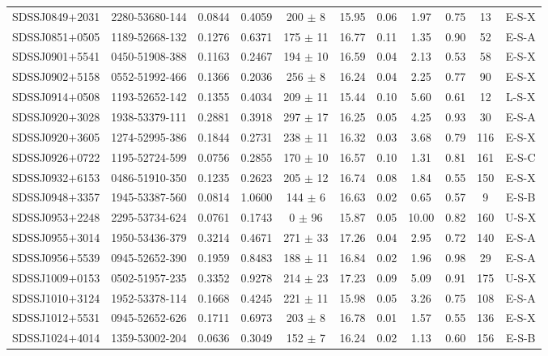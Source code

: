 \documentclass{emulateapj}
\begin{document}
\begin{table*}[htbp]
\begin{center}
\begin{tabular}{c c c c c c c c c c c}
SDSSJ0849$+$2031 & 2280-53680-144 & 0.0844 & 0.4059 & 200 $\pm$    8 & 15.95 & 0.06 & 1.97 & 0.75 & 13 & E-S-X \\ 
SDSSJ0851$+$0505 & 1189-52668-132 & 0.1276 & 0.6371 & 175 $\pm$   11 & 16.77 & 0.11 & 1.35 & 0.90 & 52 & E-S-A \\ 
SDSSJ0901$+$5541 & 0450-51908-388 & 0.1163 & 0.2467 & 194 $\pm$   10 & 16.59 & 0.04 & 2.13 & 0.53 & 58 & E-S-X \\ 
SDSSJ0902$+$5158 & 0552-51992-466 & 0.1366 & 0.2036 & 256 $\pm$    8 & 16.24 & 0.04 & 2.25 & 0.77 & 90 & E-S-X \\ 
SDSSJ0914$+$0508 & 1193-52652-142 & 0.1355 & 0.4034 & 209 $\pm$   11 & 15.44 & 0.10 & 5.60 & 0.61 & 12 & L-S-X \\ 
SDSSJ0920$+$3028 & 1938-53379-111 & 0.2881 & 0.3918 & 297 $\pm$   17 & 16.25 & 0.05 & 4.25 & 0.93 & 30 & E-S-A \\ 
SDSSJ0920$+$3605 & 1274-52995-386 & 0.1844 & 0.2731 & 238 $\pm$   11 & 16.32 & 0.03 & 3.68 & 0.79 & 116 & E-S-X \\ 
SDSSJ0926$+$0722 & 1195-52724-599 & 0.0756 & 0.2855 & 170 $\pm$   10 & 16.57 & 0.10 & 1.31 & 0.81 & 161 & E-S-C \\ 
SDSSJ0932$+$6153 & 0486-51910-350 & 0.1235 & 0.2623 & 205 $\pm$   12 & 16.74 & 0.08 & 1.84 & 0.55 & 150 & E-S-X \\ 
SDSSJ0948$+$3357 & 1945-53387-560 & 0.0814 & 1.0600 & 144 $\pm$    6 & 16.63 & 0.02 & 0.65 & 0.57 & 9 & E-S-B \\ 
SDSSJ0953$+$2248 & 2295-53734-624 & 0.0761 & 0.1743 & 0 $\pm$   96 & 15.87 & 0.05 & 10.00 & 0.82 & 160 & U-S-X \\ 
SDSSJ0955$+$3014 & 1950-53436-379 & 0.3214 & 0.4671 & 271 $\pm$   33 & 17.26 & 0.04 & 2.95 & 0.72 & 140 & E-S-A \\ 
SDSSJ0956$+$5539 & 0945-52652-390 & 0.1959 & 0.8483 & 188 $\pm$   11 & 16.84 & 0.02 & 1.96 & 0.98 & 29 & E-S-A \\ 
SDSSJ1009$+$0153 & 0502-51957-235 & 0.3352 & 0.9278 & 214 $\pm$   23 & 17.23 & 0.09 & 5.09 & 0.91 & 175 & U-S-X \\ 
SDSSJ1010$+$3124 & 1952-53378-114 & 0.1668 & 0.4245 & 221 $\pm$   11 & 15.98 & 0.05 & 3.26 & 0.75 & 108 & E-S-A \\ 
SDSSJ1012$+$5531 & 0945-52652-626 & 0.1711 & 0.6973 & 203 $\pm$    8 & 16.78 & 0.01 & 1.57 & 0.55 & 136 & E-S-X \\ 
SDSSJ1024$+$4014 & 1359-53002-204 & 0.0636 & 0.3049 & 152 $\pm$    7 & 16.24 & 0.02 & 1.13 & 0.60 & 156 & E-S-B \\ 

\end{tabular}
\end{center}
\end{table*}
\end{document}

